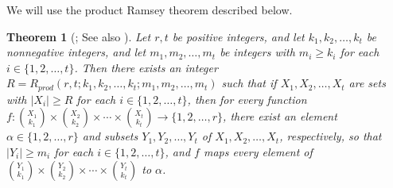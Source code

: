 \documentclass[11pt]{article}
\newtheorem{theorem}{Theorem}[section]
\newcommand\abs[1]{\lvert #1\rvert}
\begin{document}
        
        We will use the product Ramsey theorem described below.
\begin{theorem}[{\cite[Theorem 11.5]{Trotter1992}}; See also \cite{GrahamRS1990}]\label{thm:productramsey}
Let $r, t$ be positive integers, and let $k_1, k_2, \ldots, k_t$ be nonnegative integers, and
let $m_1, m_2, \ldots, m_t$ be integers with $m_i\ge k_i$ for each $i\in \{1, 2, \ldots, t\}$.
Then there exists an integer $R=R_{prod}(r,t;k_1, k_2, \ldots, k_t; m_1, m_2, \ldots, m_t)$ such that
if $X_1, X_2, \ldots, X_t$ are sets with $\abs{X_i}\ge R$ for each $i\in \{1, 2, \ldots, t\}$, 
then for every function $f:{X_1 \choose k_1}\times {X_2 \choose k_2} \times \cdots \times {X_t \choose k_t} \rightarrow \{1, 2, \ldots, r\}$, 
there exist an element $\alpha\in \{1, 2, \ldots, r\}$ and subsets $Y_1, Y_2, \ldots, Y_t$ of $X_1, X_2, \ldots, X_t$, respectively, 
so that $\abs{Y_i}\ge m_i$ for each $i\in \{1, 2, \ldots, t\}$, and 
$f$ maps every element of ${Y_1\choose k_1}\times {Y_2\choose k_2}\times \cdots \times {Y_t\choose k_t}$ to $\alpha$.
\end{theorem}
\end{document}
